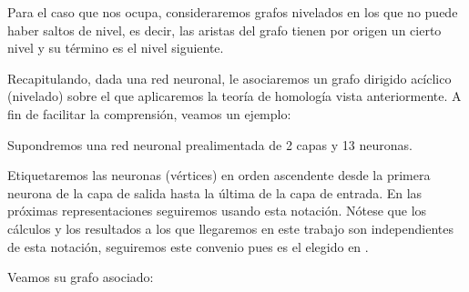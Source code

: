 \documentclass[12pt, a4paper, twoside]{book}
\numberwithin{equation}{section}
\theoremstyle{definition}
\newenvironment{ejem}
  {\pushQED{\qed}\renewcommand{\qedsymbol}{$\blacktriangleleft$}\ejemplo}
  {\popQED\endejemplo}
\theoremstyle{remark}
\theoremstyle{plain}
\begin{document}
	Para el caso que nos ocupa, consideraremos grafos nivelados en los que
	no puede haber saltos de nivel, es decir, las aristas del grafo tienen
	por origen un cierto nivel y su término es el nivel siguiente.

	Recapitulando, dada una red neuronal, le asociaremos un grafo dirigido
	acíclico (nivelado) sobre el que aplicaremos la teoría de homología 
	vista anteriormente. A fin de facilitar la comprensión, veamos un 
	ejemplo:

	\begin{ejem}
	 Supondremos una red neuronal prealimentada de 2 capas y 13 neuronas.

	 Etiquetaremos las neuronas (vértices) en orden ascendente desde la 
	 primera neurona de la capa de salida hasta la última de la capa de 
	 entrada. En las próximas representaciones seguiremos usando esta 
	 notación. Nótese que los cálculos y los resultados a los que 
	 llegaremos en este trabajo son independientes de esta notación, 
	 seguiremos este convenio pues es el elegido en 
	 \cite{Articulo-Watanabe}.

	 Veamos su grafo asociado:
		\begin{figure}[H]
			\centering
\end{figure}
\end{ejem}
\end{document}
